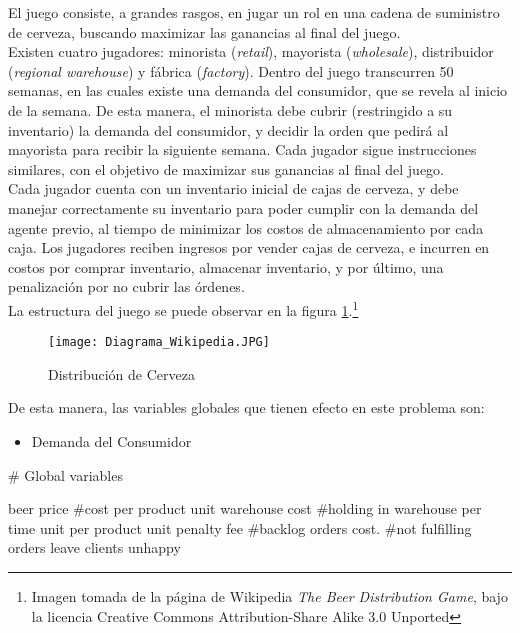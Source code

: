El juego consiste, a grandes rasgos, en jugar un rol en una cadena de suministro de cerveza, buscando maximizar las ganancias al final del juego.\\

Existen cuatro jugadores: minorista (\textit{retail}), mayorista (\textit{wholesale}), distribuidor (\textit{regional warehouse}) y f\'abrica (\textit{factory}). Dentro del juego transcurren 50 semanas, en las cuales existe una demanda del consumidor, que se revela al inicio de la semana. De esta manera, el minorista debe cubrir (restringido a su inventario) la demanda del consumidor, y decidir la orden que pedir\'a al mayorista para recibir la siguiente semana. Cada jugador sigue instrucciones similares, con el objetivo de maximizar sus ganancias al final del juego.\\

Cada jugador cuenta con un inventario inicial de cajas de cerveza,  y debe manejar correctamente su inventario para poder cumplir con la demanda del agente previo, al tiempo de minimizar los costos de almacenamiento por cada caja. Los jugadores reciben ingresos por vender cajas de cerveza, e incurren en costos por comprar inventario, almacenar inventario, y por \'ultimo, una penalizaci\'on por no cubrir las \'ordenes.\\

La estructura del juego se puede observar en la figura \ref{diagram_wikipedia}.\footnote{Imagen tomada de la página de Wikipedia \textit{The Beer Distribution Game}, bajo la licencia Creative Commons Attribution-Share Alike 3.0 Unported}\\


\begin{figure}[h]
\caption{Distribución de Cerveza}
\label{diagram_wikipedia}
\texttt{[image: Diagrama\_Wikipedia.JPG]}
\centering
\end{figure}

De esta manera, las variables globales que tienen efecto en este problema son:
\begin{itemize}
    \item Demanda del Consumidor
\end{itemize}


# Global variables

beer price          #cost per product unit
warehouse cost      #holding in warehouse per time unit per product unit
penalty fee         #backlog orders cost. 
                    #not fulfilling orders leave clients unhappy


